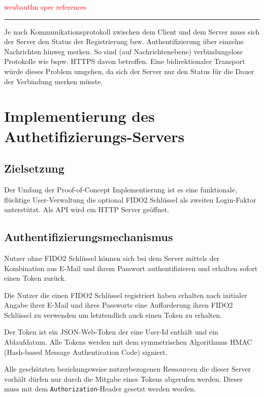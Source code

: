 \documentclass[journal]{IEEEtran}
\begin{document}
\textcolor{red}{weubauthn spec references}

\vspace{0.25em}
\rule{0.45\textwidth}{0.4pt}
\vspace{0.5em}

Je nach Kommunikationsprotokoll zwischen dem Client und dem Server muss sich
der Server den Status der Registrierung bzw. Authentifizierung über einzelne
Nachrichten hinweg merken. So sind (auf Nachrichtenebene) verbindungslose
Protokolle wie bspw. HTTPS davon betroffen. Eine bidirektionaler Transport
würde dieses Problem umgehen, da sich der Server nur den Status für die Dauer
der Verbindung merken müsste.

\section{Implementierung des Authetifizierungs-Servers}

\subsection{Zielsetzung}

Der Umfang der Proof-of-Concept Implementierung ist es eine funktionale,
flüchtige User-Verwaltung die optional FIDO2 Schlüssel als zweiten
Login-Faktor unterstützt. Als API wird ein HTTP Server geöffnet.

\subsection{Authentifizierungsmechanismus}

Nutzer ohne FIDO2 Schlüssel können sich bei dem Server mittels der Kombination
aus E-Mail und ihrem Passwort authentifizieren und erhalten sofort einen Token
zurück.

Die Nutzer die einen FIDO2 Schlüssel registriert haben erhalten nach
initialer Angabe ihrer E-Mail und ihres Passworts eine Aufforderung ihren FIDO2
Schlüssel zu verwenden um letztendlich auch einen Token zu erhalten.

Der Token ist ein JSON-Web-Token der eine User-Id enthält und ein Ablaufdatum.
Alle Tokens werden mit dem symmetrischen Algorithmus HMAC (Hash-based Message
Authentication Code) signiert.

Alle geschützten beziehungsweise nutzerbezogenen Ressourcen die dieser Server
vorhält dürfen nur durch die Mitgabe eines Tokens abgerufen werden. Dieser muss
mit dem \texttt{Authorization}-Header gesetzt werden werden.
\end{document}
